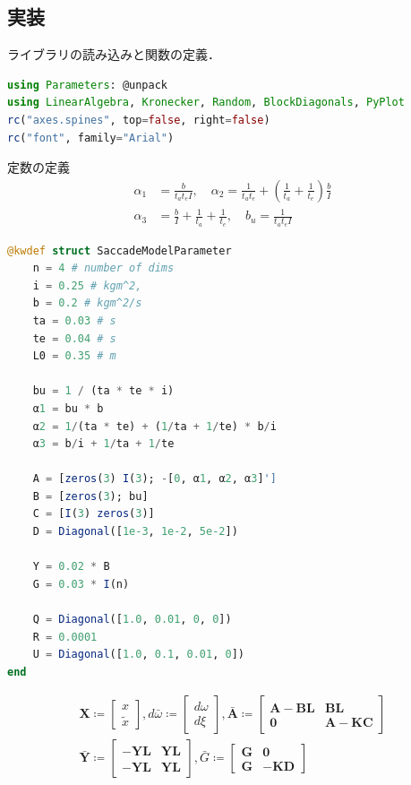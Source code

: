 \subsection{実装}
ライブラリの読み込みと関数の定義．
\begin{lstlisting}[language=julia]
using Parameters: @unpack
using LinearAlgebra, Kronecker, Random, BlockDiagonals, PyPlot
rc("axes.spines", top=false, right=false)
rc("font", family="Arial") 
\end{lstlisting}
定数の定義
\begin{align}
\alpha_{1}&=\frac{b}{t_{a} t_{e} I},\quad \alpha_{2}=\frac{1}{t_{a} t_{e}}+\left(\frac{1}{t_{a}}+\frac{1}{t_{e}}\right) \frac{b}{I} \\
\alpha_{3}&=\frac{b}{I}+\frac{1}{t_{a}}+\frac{1}{t_{e}},\quad b_{u}=\frac{1}{t_{a} t_{e} I}
\end{align}
\begin{lstlisting}[language=julia]
@kwdef struct SaccadeModelParameter
    n = 4 # number of dims
    i = 0.25 # kgm^2, 
    b = 0.2 # kgm^2/s
    ta = 0.03 # s
    te = 0.04 # s
    L0 = 0.35 # m

    bu = 1 / (ta * te * i)
    α1 = bu * b
    α2 = 1/(ta * te) + (1/ta + 1/te) * b/i
    α3 = b/i + 1/ta + 1/te

    A = [zeros(3) I(3); -[0, α1, α2, α3]']
    B = [zeros(3); bu]
    C = [I(3) zeros(3)]
    D = Diagonal([1e-3, 1e-2, 5e-2])

    Y = 0.02 * B
    G = 0.03 * I(n)

    Q = Diagonal([1.0, 0.01, 0, 0]) 
    R = 0.0001
    U = Diagonal([1.0, 0.1, 0.01, 0])
end
\end{lstlisting}
\begin{align}
\mathbf{X}\coloneqq\begin{bmatrix}
x \\
\tilde{x}
\end{bmatrix}, d \bar{\omega} \coloneqq\begin{bmatrix}
d \omega \\
d \xi
\end{bmatrix}, \bar{\mathbf{A}} \coloneqq\begin{bmatrix}
\mathbf{A}-\mathbf{B} \mathbf{L} & \mathbf{B} \mathbf{L} \\
\mathbf{0} & \mathbf{A}-\mathbf{K} \mathbf{C}
\end{bmatrix}\\
\bar{\mathbf{Y}} \coloneqq\begin{bmatrix}
-\mathbf{Y} \mathbf{L} & \mathbf{Y} \mathbf{L} \\
-\mathbf{Y} \mathbf{L} & \mathbf{Y} \mathbf{L}
\end{bmatrix}, \bar{G} \coloneqq\begin{bmatrix}
\mathbf{G} & \mathbf{0} \\
\mathbf{G} & -\mathbf{K} \mathbf{D}
\end{bmatrix}
\end{align}
